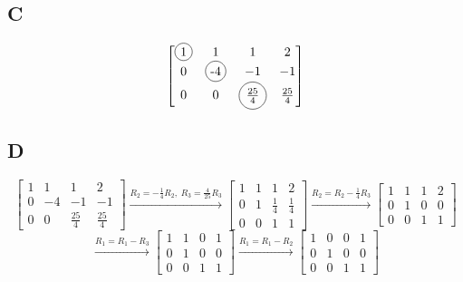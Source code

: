 \documentclass{article}
\begin{document}
\subsection*{C}
\[
	\begin{bmatrix}
		\tikz[baseline=(char.base)] \node[draw,circle,inner sep=2pt] (char){1}; & 1                                                                        & 1                                                                                    & 2            \\
		0                                                                       & \tikz[baseline=(char.base)] \node[draw,circle,inner sep=2pt] (char){-4}; & -1                                                                                   & -1           \\
		0                                                                       & 0                                                                        & \tikz[baseline=(char.base)] \node[draw,circle,inner sep=2pt] (char){$\frac{25}{4}$}; & \frac{25}{4}
	\end{bmatrix}
\]

\subsection*{D}

\[
	\begin{bmatrix}
		1 & 1  & 1            & 2            \\
		0 & -4 & -1           & -1           \\
		0 & 0  & \frac{25}{4} & \frac{25}{4}
	\end{bmatrix}
	\xrightarrow{R_2 = -\frac{1}{4}R_2,\; R_3 = \frac{4}{25}R_3}
	\begin{bmatrix}
		1 & 1 & 1           & 2           \\
		0 & 1 & \frac{1}{4} & \frac{1}{4} \\
		0 & 0 & 1           & 1
	\end{bmatrix}
	\xrightarrow{R_2 = R_2 - \frac{1}{4}R_3}
	\begin{bmatrix}
		1 & 1 & 1 & 2 \\
		0 & 1 & 0 & 0 \\
		0 & 0 & 1 & 1
	\end{bmatrix}
\]
\[
	\xrightarrow{R_1 = R_1 - R_3}
	\begin{bmatrix}
		1 & 1 & 0 & 1 \\
		0 & 1 & 0 & 0 \\
		0 & 0 & 1 & 1
	\end{bmatrix}
	\xrightarrow{R_1 = R_1 - R_2}
	\begin{bmatrix}
		1 & 0 & 0 & 1 \\
		0 & 1 & 0 & 0 \\
		0 & 0 & 1 & 1
	\end{bmatrix}
\]
\end{document}
